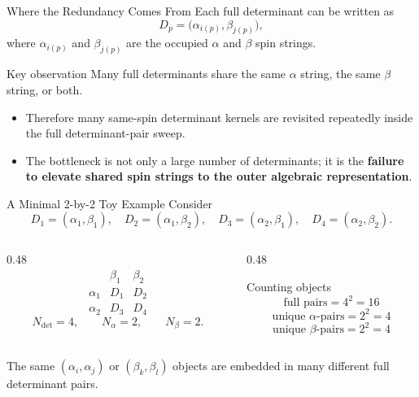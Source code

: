\documentclass{beamer}
\newcommand{\Dfull}{N_{\mathrm{det}}}
\newcommand{\Na}{N_{\alpha}}
\newcommand{\Nb}{N_{\beta}}
\begin{document}
\begin{frame}{Where the Redundancy Comes From}
  Each full determinant can be written as
  \[
  D_p = \bigl(\alpha_{i(p)}, \beta_{j(p)}\bigr),
  \]
  where $\alpha_{i(p)}$ and $\beta_{j(p)}$ are the occupied $\alpha$ and
  $\beta$ spin strings.

  \begin{block}{Key observation}
    Many full determinants share the same $\alpha$ string, the same $\beta$
    string, or both.
  \end{block}

  \begin{itemize}
    \item Therefore many same-spin determinant kernels are revisited
          repeatedly inside the full determinant-pair sweep.
    \item The bottleneck is not only a large number of determinants; it is the
          \textbf{failure to elevate shared spin strings to the outer algebraic
          representation}.
  \end{itemize}
\end{frame}

\begin{frame}{A Minimal 2-by-2 Toy Example}
  Consider
  \[
  D_1=(\alpha_1,\beta_1),\quad
  D_2=(\alpha_1,\beta_2),\quad
  D_3=(\alpha_2,\beta_1),\quad
  D_4=(\alpha_2,\beta_2).
  \]

  \begin{columns}[T]
    \begin{column}{0.48\textwidth}
      \[
      \begin{array}{c|cc}
           & \beta_1 & \beta_2 \\ \hline
        \alpha_1 & D_1 & D_2 \\
        \alpha_2 & D_3 & D_4
      \end{array}
      \]
      \[
      \Dfull = 4,\qquad \Na = 2,\qquad \Nb = 2.
      \]
    \end{column}
    \begin{column}{0.48\textwidth}
      \begin{block}{Counting objects}
        \[
        \text{full pairs} = 4^2 = 16
        \]
        \[
        \text{unique }\alpha\text{-pairs} = 2^2 = 4
        \]
        \[
        \text{unique }\beta\text{-pairs} = 2^2 = 4
        \]
      \end{block}
    \end{column}
  \end{columns}

  \vspace{0.4em}
  The same $(\alpha_i,\alpha_j)$ or $(\beta_k,\beta_l)$ objects are embedded in
  many different full determinant pairs.
\end{frame}
\end{document}
